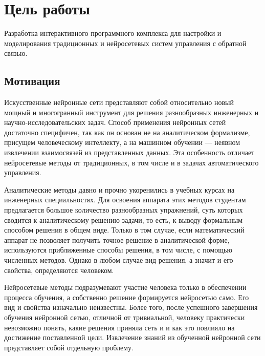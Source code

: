 
\section{Цель работы}



Разработка интерактивного программного комплекса для настройки и
моделирования традиционных и нейросетевых систем управления с обратной
связью.



\subsection{Мотивация}

Искусственные нейронные сети представляют собой относительно новый
мощный и многогранный инструмент для решения разнообразных инженерных
и научно-исследовательских задач.  Способ применения нейронных сетей
достаточно специфичен, так как он основан не на аналитическом
формализме, присущем человеческому интеллекту, а на машинном обучении
--- неявном извлечении взаимосвязей из представленных данных.  Эта
особенность отличает нейросетевые методы от традиционных, в том числе
и в задачах автоматического управления.

Аналитические методы давно и прочно укоренились в учебных курсах на
инженерных специальностях.  Для освоения аппарата этих методов
студентам предлагается большое количество разнообразных упражнений,
суть которых сводится к аналитическому решению задачи, то есть, к
выводу формальным способом решения в общем виде.  Только в том случае,
если математический аппарат не позволяет получить точное решение в
аналитической форме, используются приближенные способы решения, в том
числе, с помощью численных методов.  Однако в любом случае вид
решения, а значит и его свойства, определяются человеком.

Нейросетевые методы подразумевают участие человека только в
обеспечении процесса обучения, а собственно решение формируется
нейросетью само.  Его вид и свойства изначально неизвестны.  Более
того, после успешного завершения обучения нейронной сетью, отличной от
тривиальной, человеку практически невозможно понять, какие решения
приняла сеть и и как это повлияло на достижение поставленной цели.
Извлечение знаний из обученной нейронной сети представляет собой
отдельную проблему.

